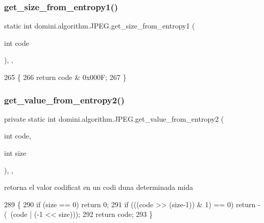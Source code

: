 \subsubsection{\texorpdfstring{get\+\_\+size\+\_\+from\+\_\+entropy1()}{get\_size\_from\_entropy1()}}
{\footnotesize\ttfamily static int domini.\+algorithm.\+J\+P\+E\+G.\+get\+\_\+size\+\_\+from\+\_\+entropy1 (\begin{DoxyParamCaption}\item[{int}]{code }\end{DoxyParamCaption})\hspace{0.3cm}{\ttfamily [inline]}, {\ttfamily [static]}, {\ttfamily [private]}}


\begin{DoxyCode}
265                                                         \{
266         \textcolor{keywordflow}{return} code & 0x000F;
267     \}
\end{DoxyCode}
\mbox{\label{classdomini_1_1algorithm_1_1JPEG_a41c69fe2e29999dd17a555859df22530}} 
\subsubsection{\texorpdfstring{get\+\_\+value\+\_\+from\+\_\+entropy2()}{get\_value\_from\_entropy2()}}
{\footnotesize\ttfamily private static int domini.\+algorithm.\+J\+P\+E\+G.\+get\+\_\+value\+\_\+from\+\_\+entropy2 (\begin{DoxyParamCaption}\item[{int}]{code,  }\item[{int}]{size }\end{DoxyParamCaption})\hspace{0.3cm}{\ttfamily [inline]}, {\ttfamily [static]}, {\ttfamily [private]}}



retorna el valor codificat en un codi d\textquotesingle{}una determinada mida 


\begin{DoxyCode}
289                                                                    \{
290         \textcolor{keywordflow}{if} (size == 0) \textcolor{keywordflow}{return} 0;
291         \textcolor{keywordflow}{if} (((code >> (size-1)) & 1) == 0) \textcolor{keywordflow}{return} -(~(code | (-1 << size)));
292         \textcolor{keywordflow}{return} code;
293     \}
\end{DoxyCode}
\mbox{\label{classdomini_1_1algorithm_1_1JPEG_a3a6e16b0ee34746e4b0118ed9107bd75}} 
